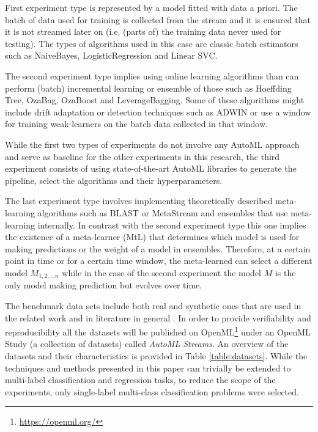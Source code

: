 \documentclass{sig-alternate-br}
\begin{document}
First experiment type is represented by a model fitted with data a priori. The batch of data used for training is collected from the stream and it is ensured that it is not streamed later on (i.e. (parts of) the training data never used for testing). The types of algorithms used in this case are classic batch estimators such as NaiveBayes, LogisticRegression and Linear SVC.

The second experiment type implies using online learning algorithms than can perform (batch) incremental learning or ensemble of those such as Hoeffding Tree, OzaBag, OzaBoost and LeverageBagging. Some of these algorithms might include drift adaptation or detection techniques such as ADWIN or use a window for training weak-learners on the batch data collected in that window.  

While the first two types of experiments do not involve any AutoML approach and serve as baseline for the other experiments in this research, the third experiment consists of using state-of-the-art AutoML libraries to generate the pipeline, select the algorithms and their hyperparameters. 

The last experiment type involves implementing theoretically described meta-learning algorithms such as BLAST or MetaStream and ensembles that use meta-learning internally. In contrast with the second experiment type this one implies the existence of a meta-learner (MtL) that determines which model is used for making predictions or the weight of a model in ensembles. Therefore, at a certain point in time or for a certain time window, the meta-learned can select a different model $M_{1,2, ... n}$ while in the case of the second experiment the model $M$ is the only model making prediction but evolves over time.

The benchmark data sets include both real and synthetic ones that are used in the related work and in literature in general \cite{van2016massively}. In order to provide verifiability and reproducibility all the datasets will be published on OpenML\footnote{\url{https://openml.org/}} under an OpenML Study (a collection of datasets) called \textit{AutoML Streams}. An overview of the datasets and their characteristics is provided in Table \ref{table:datasets}. While the techniques and methods presented in this paper can trivially be extended to multi-label classification and regression tasks, to reduce the scope of the experiments, only single-label multi-class classification problems were selected.   
\end{document}

